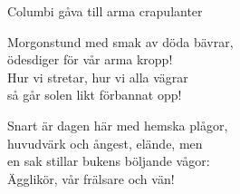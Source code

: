 \begin{song}{Columbi gåva till arma crapulanter}
	
	
	
	
	Morgonstund med smak av döda bävrar,\\
	ödesdiger för vår arma kropp!\\
	Hur vi stretar, hur vi alla vägrar\\
	så går solen likt förbannat opp!\\
	\begin{repetition}
		Snart är dagen här med hemska plågor,\\
		huvudvärk och ångest, elände, men\\
		en sak stillar bukens böljande vågor:\\
		Ägglikör, vår frälsare och vän!
	\end{repetition}
	
\end{song}
